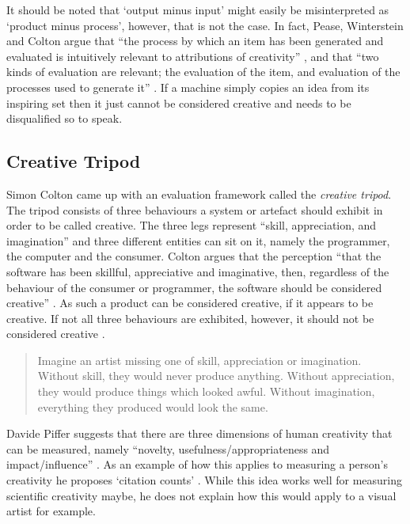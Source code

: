 It should be noted that `output minus input' might easily be misinterpreted as `product minus process', however, that is not the case. In fact, Pease, Winterstein and Colton argue that ``the process by which an item has been generated and evaluated is intuitively relevant to attributions of creativity'' \autocite*{Pease2001}, and that ``two kinds of evaluation are relevant; the evaluation of the item, and evaluation of the processes used to generate it'' \autocite*{Pease2001}. If a machine simply copies an idea from its inspiring set then it just cannot be considered creative and needs to be disqualified so to speak.


\subsection{Creative Tripod}

Simon Colton came up with an evaluation framework called the \textit{creative tripod}. The tripod consists of three behaviours a system or artefact should exhibit in order to be called creative. The three legs represent ``skill, appreciation, and imagination'' and three different entities can sit on it, namely the programmer, the computer and the consumer. Colton argues that the perception ``that the software has been skillful, appreciative and imaginative, then, regardless of the behaviour of the consumer or programmer, the software should be considered creative'' \autocite*{Colton2008, Colton2008a}. As such a product can be considered creative, if it appears to be creative. If not all three behaviours are exhibited, however, it should not be considered creative \autocite{Colton2008, Colton2008a}.

\begin{quotation}
  Imagine an artist missing one of skill, appreciation or imagination. Without skill, they would never produce anything. Without appreciation, they would produce things which looked awful. Without imagination, everything they produced would look the same. 
\end{quotation}

\spirals

Davide Piffer suggests that there are three dimensions of human creativity that can be measured, namely ``novelty, usefulness/appropriateness and impact/influence'' \autocite*{Piffer2012}. As an example of how this applies to measuring a person's creativity he proposes `citation counts' \autocite{Piffer2012}. While this idea works well for measuring scientific creativity maybe, he does not explain how this would apply to a visual artist for example.


